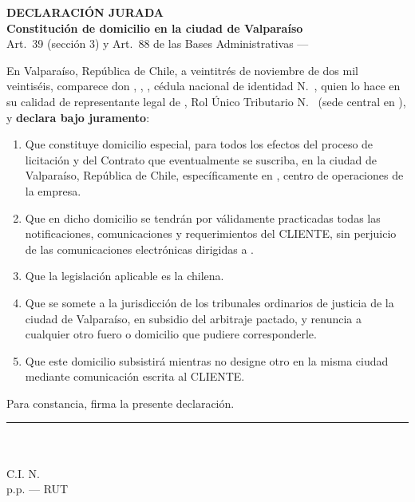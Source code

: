 \documentclass[11pt]{article}
\begin{document}
\begin{center}
  {\Large\bfseries DECLARACIÓN JURADA}\\[6pt]
  {\bfseries Constitución de domicilio en la ciudad de Valparaíso}\\[4pt]
  {\small Art.~39\textdegree{} (sección 3) y Art.~88\textdegree{} de las Bases Administrativas --- \LFXlicitacion}
\end{center}

\noindent En Valparaíso, República de Chile, a veintitrés de noviembre de dos mil veintiséis, comparece don \textbf{\LFXrepresentante}, \SIMnacionalidad, \SIMprofesion, cédula nacional de identidad N.\textdegree~\SIMrunrepresentante, quien lo hace en su calidad de representante legal de \textbf{\LFXempresa}, Rol Único Tributario N.\textdegree~\LFXrut{} (sede central en \SIMsedecentral), y \textbf{declara bajo juramento}:

\begin{enumerate}[label=\arabic*.,leftmargin=2em,itemsep=2pt]
  \item Que constituye domicilio especial, para todos los efectos del proceso de licitación y del Contrato que eventualmente se suscriba, en la ciudad de Valparaíso, República de Chile, específicamente en \textbf{\LFXdomicilio}, centro de operaciones de la empresa.
  \item Que en dicho domicilio se tendrán por válidamente practicadas todas las notificaciones, comunicaciones y requerimientos del CLIENTE, sin perjuicio de las comunicaciones electrónicas dirigidas a \LFXcorreo.
  \item Que la legislación aplicable es la chilena.
  \item Que se somete a la jurisdicción de los tribunales ordinarios de justicia de la ciudad de Valparaíso, en subsidio del arbitraje pactado, y renuncia a cualquier otro fuero o domicilio que pudiere corresponderle.
  \item Que este domicilio subsistirá mientras no designe otro en la misma ciudad mediante comunicación escrita al CLIENTE.
\end{enumerate}

\noindent Para constancia, firma la presente declaración.

\vspace{12pt}
\begin{center}
  \rule{7cm}{0.5pt}\\
  \textbf{\LFXrepresentante}\\
  C.I. N.\textdegree~\SIMrunrepresentante\\
  p.p. \LFXempresa{} --- RUT \LFXrut
\end{center}
\end{document}
